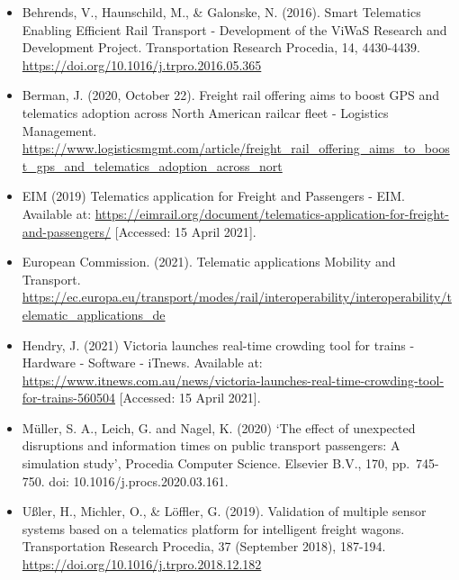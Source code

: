 \documentclass[
]{book}
\providecommand{\tightlist}{%
  \setlength{\itemsep}{0pt}\setlength{\parskip}{0pt}}
\begin{document}
\begin{itemize}
\tightlist
\item
  Behrends, V., Haunschild, M., \& Galonske, N. (2016). Smart Telematics Enabling Efficient Rail Transport - Development of the ViWaS Research and Development Project. Transportation Research Procedia, 14, 4430-4439. \url{https://doi.org/10.1016/j.trpro.2016.05.365}
\item
  Berman, J. (2020, October 22). Freight rail offering aims to boost GPS and telematics adoption across North American railcar fleet - Logistics Management. \url{https://www.logisticsmgmt.com/article/freight_rail_offering_aims_to_boost_gps_and_telematics_adoption_across_nort}
\item
  EIM (2019) Telematics application for Freight and Passengers - EIM. Available at: \url{https://eimrail.org/document/telematics-application-for-freight-and-passengers/} {[}Accessed: 15 April 2021{]}.
\item
  European Commission. (2021). Telematic applications \textbar{} Mobility and Transport. \url{https://ec.europa.eu/transport/modes/rail/interoperability/interoperability/telematic_applications_de}
\item
  Hendry, J. (2021) Victoria launches real-time crowding tool for trains - Hardware - Software - iTnews. Available at: \url{https://www.itnews.com.au/news/victoria-launches-real-time-crowding-tool-for-trains-560504} {[}Accessed: 15 April 2021{]}.
\item
  Müller, S. A., Leich, G. and Nagel, K. (2020) `The effect of unexpected disruptions and information times on public transport passengers: A simulation study', Procedia Computer Science. Elsevier B.V., 170, pp.~745-750. doi: 10.1016/j.procs.2020.03.161.
\item
  Ußler, H., Michler, O., \& Löffler, G. (2019). Validation of multiple sensor systems based on a telematics platform for intelligent freight wagons. Transportation Research Procedia, 37 (September 2018), 187-194. \url{https://doi.org/10.1016/j.trpro.2018.12.182}
\end{itemize}

  
\end{document}
